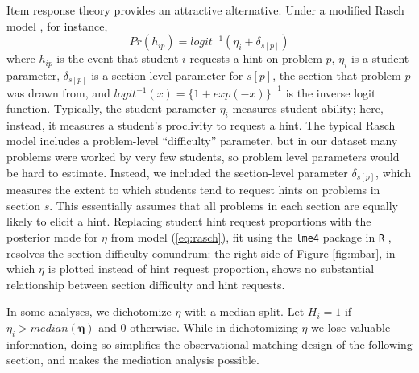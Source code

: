 \documentclass{article}
\begin{document}

Item response theory \citep[e.g.][]{irtHandbook} provides an attractive alternative.
Under a modified Rasch model \citep[e.g.][]{rasch}, for instance,
\begin{equation}\label{eq:rasch}
Pr(h_{ip})=logit^{-1}(\eta_i+\delta_{s[p]})
\end{equation}
where $h_{ip}$ is the event that student $i$ requests a hint on
problem $p$, $\eta_i$ is a student parameter, $\delta_{s[p]}$ is a
section-level parameter for $s[p]$, the section that problem $p$ was
drawn from, and $logit^{-1}(x)=\{1+exp(-x)\}^{-1}$ is the inverse logit
function.
Typically, the student parameter $\eta_i$ measures student ability;
here, instead, it measures a student's proclivity to request a hint.
The typical Rasch model includes a problem-level ``difficulty'' parameter, but in our
dataset many problems were worked by very few students, so problem
level parameters would be hard to estimate.
Instead, we included the section-level parameter $\delta_{s[p]}$,
which measures the extent to which students tend to request hints on
problems in section $s$.
This essentially assumes that all problems in each section are equally
likely to elicit a hint.
Replacing student hint request proportions with the posterior mode for
$\eta$ from model (\ref{eq:rasch}), fit using the \texttt{lme4}
package in \texttt{R} \citep{lme4}, resolves the section-difficulty conundrum: the right
side of Figure \ref{fig:mbar}, in which $\eta$ is plotted instead of
hint request proportion, shows no substantial relationship between
section difficulty and hint requests.

In some analyses, we dichotomize $\eta$ with a median split.
Let $H_i=1$ if $\eta_i>median(\bm{\eta})$ and 0 otherwise.
While in dichotomizing $\eta$ we lose valuable information, doing so
simplifies the observational matching design of the following section,
and makes the mediation analysis possible.
\end{document}
